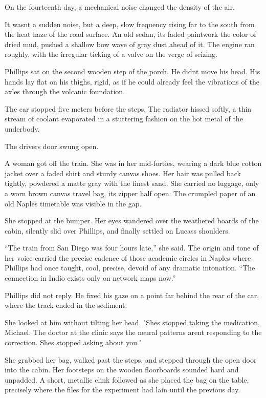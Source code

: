 \documentclass[
  ngerman,
]{article}
\begin{document}
On the fourteenth day, a mechanical noise changed the density of the
air.

It wasn\textquotesingle t a sudden noise, but a deep, slow frequency
rising far to the south from the heat haze of the road surface. An old
sedan, its faded paintwork the color of dried mud, pushed a shallow bow
wave of gray dust ahead of it. The engine ran roughly, with the
irregular ticking of a valve on the verge of seizing.

Phillips sat on the second wooden step of the porch. He
didn\textquotesingle t move his head. His hands lay flat on his thighs,
rigid, as if he could already feel the vibrations of the axles through
the volcanic foundation.

The car stopped five meters before the steps. The radiator hissed
softly, a thin stream of coolant evaporated in a stuttering fashion on
the hot metal of the underbody.

The driver\textquotesingle s door swung open.

A woman got off the train. She was in her mid-forties, wearing a dark
blue cotton jacket over a faded shirt and sturdy canvas shoes. Her hair
was pulled back tightly, powdered a matte gray with the finest sand. She
carried no luggage, only a worn brown canvas travel bag, its zipper half
open. The crumpled paper of an old Naples timetable was visible in the
gap.

She stopped at the bumper. Her eyes wandered over the weathered boards
of the cabin, silently slid over Phillips, and finally settled on
Lucas\textquotesingle s shoulders.

``The train from San Diego was four hours late,'' she said. The origin
and tone of her voice carried the precise cadence of those academic
circles in Naples where Phillips had once taught, cool, precise, devoid
of any dramatic intonation. ``The connection in Indio exists only on
network maps now.''

Phillips did not reply. He fixed his gaze on a point far behind the rear
of the car, where the track ended in the sediment.

She looked at him without tilting her head. "She\textquotesingle s
stopped taking the medication, Michael. The doctor at the clinic says
the neural patterns aren\textquotesingle t responding to the correction.
She\textquotesingle s stopped asking about you."

She grabbed her bag, walked past the steps, and stepped through the open
door into the cabin. Her footsteps on the wooden floorboards sounded
hard and unpadded. A short, metallic clink followed as she placed the
bag on the table, precisely where the files for the experiment had lain
until the previous day.
\end{document}
